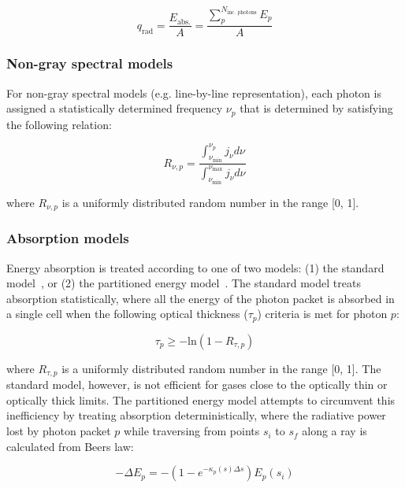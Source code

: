 \begin{equation}
 q_\text{rad} = \frac{ E_\text{abs.} }{A} =  \frac{ \displaystyle \sum_{p}^{N_{\text{inc. photons}}} \displaystyle E_{p} }{ A }
 \label{eq:my_divq}
\end{equation}

\subsubsection{Non-gray spectral models}

For non-gray spectral models (e.g. line-by-line representation), each photon is assigned a statistically determined frequency $\nu_p$ that is determined by satisfying the following relation:

\begin{equation}
R_{\nu,p} = \frac{\int_{\nu_{\text{min}}}^{\nu_p} j_{\nu} d \nu}{\int_{\nu_{\text{min}}}^{\nu_{\text{max}}} j_{\nu} d \nu}
\end{equation}

\noindent where $R_{\nu,p}$ is a uniformly distributed random number in the range [0, 1].

\subsubsection{Absorption models}

Energy absorption is treated according to one of two models:  (1) the standard model~\cite{Mod03}, or (2) the partitioned energy model~\cite{MP77}.
The standard model treats absorption statistically, where all the energy of the photon packet is absorbed in a single cell when the following optical thickness ($\tau_p$) criteria is met for photon $p$:

\begin{equation}
 \tau_p \geq - \text{ln} \left ( 1 - R_{\tau,p} \right ) 
\end{equation}

\noindent where $R_{\tau,p}$ is a uniformly distributed random number in the range [0, 1].
The standard model, however, is not efficient for gases close to the optically thin or optically thick limits.
The partitioned energy model attempts to circumvent this inefficiency by treating absorption deterministically, where the radiative power lost by photon packet $p$ while traversing from points $s_{i}$ to $s_{f}$ along a ray is calculated from Beers law:

\begin{equation}
 - \Delta E_{p} = - ( 1 - e^{-\kappa_p(s) \Delta s } ) E_{p}(s_{i})
 \label{eq:E_p}
\end{equation}

